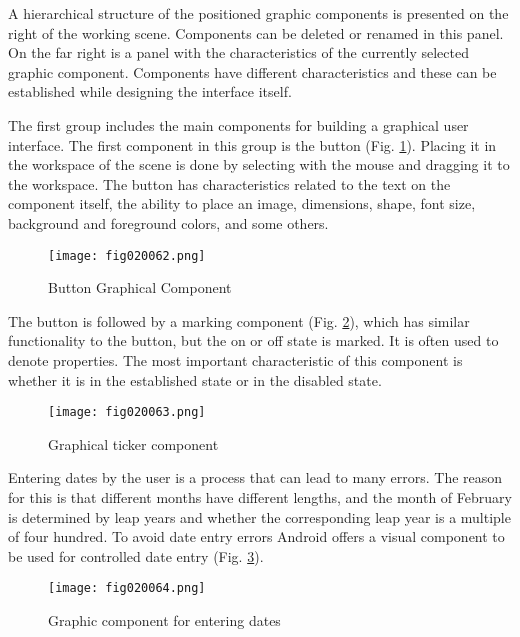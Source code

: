 A hierarchical structure of the positioned graphic components is presented on the right of the working scene. Components can be deleted or renamed in this panel. On the far right is a panel with the characteristics of the currently selected graphic component. Components have different characteristics and these can be established while designing the interface itself.

The first group includes the main components for building a graphical user interface. The first component in this group is the button (Fig. \ref{fig020062}). Placing it in the workspace of the scene is done by selecting with the mouse and dragging it to the workspace. The button has characteristics related to the text on the component itself, the ability to place an image, dimensions, shape, font size, background and foreground colors, and some others.

\begin{figure}[H]
   \centering
   \texttt{[image: fig020062.png]}
   \caption{Button Graphical Component}
\label{fig020062}
\end{figure}

The button is followed by a marking component (Fig. \ref{fig020063}), which has similar functionality to the button, but the on or off state is marked. It is often used to denote properties. The most important characteristic of this component is whether it is in the established state or in the disabled state.

\begin{figure}[H]
   \centering
   \texttt{[image: fig020063.png]}
   \caption{Graphical ticker component}
\label{fig020063}
\end{figure}

Entering dates by the user is a process that can lead to many errors. The reason for this is that different months have different lengths, and the month of February is determined by leap years and whether the corresponding leap year is a multiple of four hundred. To avoid date entry errors Android offers a visual component to be used for controlled date entry (Fig. \ref{fig020064}).

\begin{figure}[H]
   \centering
   \texttt{[image: fig020064.png]}
   \caption{Graphic component for entering dates}
\label{fig020064}
\end{figure}

